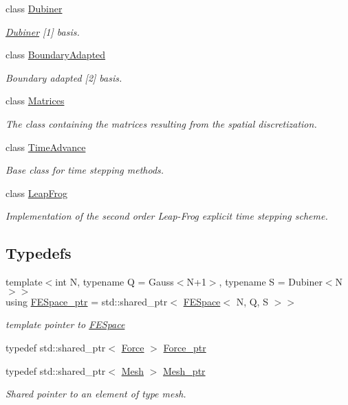 \begin{DoxyCompactItemize}
class \hyperlink{classTspeed_1_1Dubiner}{Dubiner}
\begin{DoxyCompactList}\small\item\em \hyperlink{classTspeed_1_1Dubiner}{Dubiner} \mbox{[}1\mbox{]} basis. \end{DoxyCompactList}\item 
class \hyperlink{classTspeed_1_1BoundaryAdapted}{Boundary\-Adapted}
\begin{DoxyCompactList}\small\item\em Boundary adapted \mbox{[}2\mbox{]} basis. \end{DoxyCompactList}\item 
class \hyperlink{classTspeed_1_1Matrices}{Matrices}
\begin{DoxyCompactList}\small\item\em The class containing the matrices resulting from the spatial discretization. \end{DoxyCompactList}\item 
class \hyperlink{classTspeed_1_1TimeAdvance}{Time\-Advance}
\begin{DoxyCompactList}\small\item\em Base class for time stepping methods. \end{DoxyCompactList}\item 
class \hyperlink{classTspeed_1_1LeapFrog}{Leap\-Frog}
\begin{DoxyCompactList}\small\item\em Implementation of the second order Leap-\/\-Frog explicit time stepping scheme. \end{DoxyCompactList}\end{DoxyCompactItemize}
\subsection*{Typedefs}
\begin{DoxyCompactItemize}
\item 
{\footnotesize template$<$int N, typename Q  = Gauss$<$\-N+1$>$, typename S  = Dubiner$<$\-N$>$$>$ }\\using \hyperlink{namespaceTspeed_a05fcb57094666c8f5ab1e90d1a6fecf8}{F\-E\-Space\-\_\-ptr} = std\-::shared\-\_\-ptr$<$ \hyperlink{classTspeed_1_1FESpace}{F\-E\-Space}$<$ N, Q, S $>$$>$
\begin{DoxyCompactList}\small\item\em template pointer to \hyperlink{classTspeed_1_1FESpace}{F\-E\-Space} \end{DoxyCompactList}\item 
typedef std\-::shared\-\_\-ptr$<$ \hyperlink{classTspeed_1_1Force}{Force} $>$ \hyperlink{namespaceTspeed_a3795c740b127fc84de9d80cc919dd4d1}{Force\-\_\-ptr}
\item 
typedef std\-::shared\-\_\-ptr$<$ \hyperlink{classTspeed_1_1Mesh}{Mesh} $>$ \hyperlink{namespaceTspeed_a7367a01365c4cc2c1a09305b3effc4e8}{Mesh\-\_\-ptr}
\begin{DoxyCompactList}\small\item\em Shared pointer to an element of type mesh. \end{DoxyCompactList}\end{DoxyCompactItemize}
